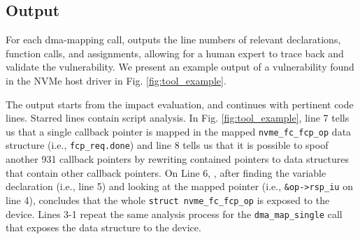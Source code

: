 \subsection{Output}
For each dma-mapping call, \tool outputs the line numbers of relevant declarations, function calls, and assignments, allowing for a human expert to trace back and validate the vulnerability. We present an example output of a vulnerability found in the NVMe host driver in Fig. \ref{fig:tool_example}.

The output starts from the impact evaluation, and continues with pertinent code lines. Starred lines contain script analysis. In Fig. \ref{fig:tool_example}, line 7 tells us that a single callback pointer is mapped in the mapped \texttt{nvme\_fc\_fcp\_op} data structure (i.e., \texttt{fcp\_req.done}) and line 8 tells us that it is possible to spoof another 931 callback pointers by rewriting contained pointers to data structures that contain other callback pointers. On Line 6, \tool, after finding the variable declaration (i.e., line 5) and looking at the mapped pointer (i.e., \texttt{\&op->rsp\_iu} on line 4), concludes that the whole \texttt{struct nvme\_fc\_fcp\_op} is exposed to the device. Lines 3-1 repeat the same analysis process for the \texttt{dma\_map\_single} call that exposes the data structure to the device. 

